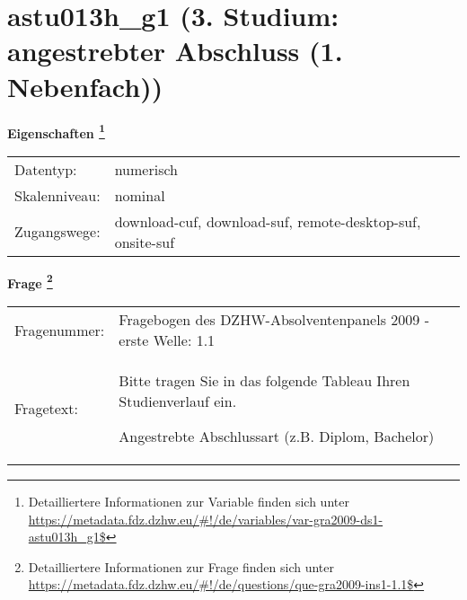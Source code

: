 
    \setcounter{footnote}{0}

    \vspace*{-1.8cm}
	\section{astu013h\_g1 (3. Studium: angestrebter Abschluss (1. Nebenfach))}
	\label{section:astu013h_g1}



    \vspace*{0.5cm}
    \noindent\textbf{Eigenschaften
	\footnote{Detailliertere Informationen zur Variable finden sich unter
		\url{https://metadata.fdz.dzhw.eu/\#!/de/variables/var-gra2009-ds1-astu013h_g1$}}}\\
	\begin{tabularx}{\hsize}{@{}lX}
	Datentyp: & numerisch \\
	Skalenniveau: & nominal \\
	Zugangswege: &
	  download-cuf, 
	  download-suf, 
	  remote-desktop-suf, 
	  onsite-suf
 \\
    \end{tabularx}



				\vspace*{0.5cm}
                \noindent\textbf{Frage
	                \footnote{Detailliertere Informationen zur Frage finden sich unter
		              \url{https://metadata.fdz.dzhw.eu/\#!/de/questions/que-gra2009-ins1-1.1$}}}\\
				\begin{tabularx}{\hsize}{@{}lX}
					Fragenummer: &
					  Fragebogen des DZHW-Absolventenpanels 2009 - erste Welle:
					  1.1
 \\
					Fragetext: & Bitte tragen Sie in das folgende Tableau Ihren Studienverlauf ein.\par  Angestrebte Abschlussart (z.B. Diplom, Bachelor) \\
				\end{tabularx}





